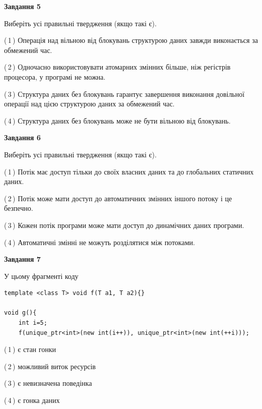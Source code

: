 \documentclass[12pt, ukrainian]{article}
\begin{document}
\begin {large}
{\begin{center}
\textbf{Завдання 5}
\end{center}

Виберіть усі правильні твердження (якщо такі є).\par
\vspace{2mm}

(\,1\,) Операція над вільною від блокувань структурою даних завжди виконається за обмежений час.%

(\,2\,) Одночасно використовувати атомарних змінних більше, ніж регістрів процесора, у програмі не можна.%

(\,3\,) Структура даних без блокувань гарантує завершення виконання довільної операції над цією структурою даних за обмежений час.%

(\,4\,) Структура даних без блокувань може не бути вільною від блокувань.%
\newpage


\begin{center}
\textbf{Завдання 6}
\end{center}

Виберіть усі правильні твердження (якщо такі є).\par
\vspace{2mm}

(\,1\,) Потік має доступ тільки до своїх власних даних та до глобальних статичних даних.%

(\,2\,) Потік може мати доступ до автоматичних змінних іншого потоку і це безпечно.%

(\,3\,) Кожен потік програми може мати доступ до динамічних даних програми.%

(\,4\,) Автоматичні змінні не можуть розділятися між потоками.%


\begin{center}
\textbf{Завдання 7}
\end{center}

У цьому фрагменті коду
\begin{verbatim}
template <class T> void f(T a1, T a2){}

void g(){
    int i=5;
    f(unique_ptr<int>(new int(i++)), unique_ptr<int>(new int(++i)));
\end{verbatim}

(\,1\,) є стан гонки%

(\,2\,) можливий виток ресурсів%

(\,3\,) є невизначена поведінка%

(\,4\,) є гонка даних%

}
\end {large}

\vspace{4mm}
\newpage
\end{document}
